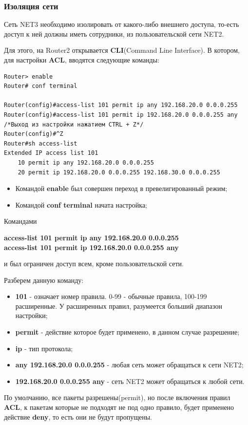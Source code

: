 \documentclass[14pt,a4paper,report]{report}
\begin{document}
\subsubsection{Изоляция сети}
Сеть NET3 необходимо изолировать от какого-либо внешнего доступа, то-есть доступ к ней должны иметь сотрудники, из пользовательской сети NET2.

Для этого, на Router2 открывается \textbf{CLI}(Command Line Interface). В котором, для настройки \textbf{ACL}, вводятся следующие команды:
\begin{lstlisting}[language={}, caption={index.html}]
Router> enable
Router# conf terminal

Router(config)#access-list 101 permit ip any 192.168.20.0 0.0.0.255
Router(config)#access-list 101 permit ip 192.168.20.0 0.0.0.255 any
/*Выход из настройки нажатием CTRL + Z*/
Router(config)#^Z
Router#sh access-list
Extended IP access list 101
    10 permit ip any 192.168.20.0 0.0.0.255
    20 permit ip 192.168.20.0 0.0.0.255 192.168.30.0 0.0.0.255
\end{lstlisting}
\begin{itemize}
\item Командой \textbf{enable} был совершен переход в превелигированный режим;
\item Командой \textbf{conf terminal} начата настройка;
\end{itemize}
Командами
\begin{center}
\textbf{access-list 101 permit ip any 192.168.20.0 0.0.0.255}\\
\textbf{access-list 101 permit ip 192.168.20.0 0.0.0.255 any}
\end{center}
и был ограничен доступ всем, кроме пользовательской сети.

Разберем данную команду:
\begin{itemize}
\item \textbf{101} - означает номер правила. 0-99 - обычные правила, 100-199 расширенные. У расширенных правил, разумеется больший диапазон настройки;
\item \textbf{permit} - действие которое будет применено, в данном случае разрешение;
\item \textbf{ip} - тип протокола;
\item \textbf{any 192.168.20.0 0.0.0.255} - любая сеть может обращаться к сети NET2;
\item \textbf{192.168.20.0 0.0.0.255 any} - сеть NET2 может обращаться к любой сети.
\end{itemize}
По умолчанию, все пакеты разрешены(permit), но после включения правил \textbf{ACL}, к пакетам которые не подходят не под одно правило, будет применено действие \textbf{deny}, то есть они не будут пропущены.
\end{document}
